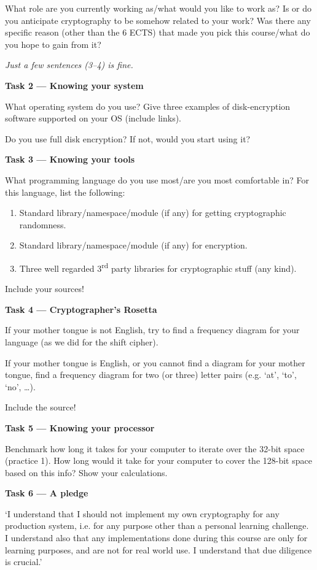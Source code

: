 \documentclass{practice}
\begin{document}
What role are you currently working as/what would you like to work as?
Is or do you anticipate cryptography to be somehow related to your work?
Was there any specific reason (other than the 6 ECTS) that made you pick this course/what do you hope to gain from it?

\textit{Just a few sentences (3--4) is fine.}

\textbf{Task 2 --- Knowing your system}

What operating system do you use? Give three examples of disk-encryption software supported on your OS (include links).

Do you use full disk encryption? If not, would you start using it?

\textbf{Task 3 --- Knowing your tools}

What programming language do you use most/are you most comfortable in?
For this language, list the following:
\begin{enumerate}
  \item Standard library/namespace/module (if any) for getting cryptographic randomness.
  \item Standard library/namespace/module (if any) for encryption.
  \item Three well regarded 3\textsuperscript{rd} party libraries for cryptographic stuff (any kind).
\end{enumerate}

Include your sources!

\textbf{Task 4 --- Cryptographer's Rosetta}

If your mother tongue is not English, try to find a frequency diagram for your language (as we did for the shift cipher).

If your mother tongue is English, or you cannot find a diagram for your mother tongue, find a frequency diagram for two (or three) letter pairs (e.g. `at', `to', `no', \dots).

Include the source!

\textbf{Task 5 --- Knowing your processor}

Benchmark how long it takes for your computer to iterate over the 32-bit space (practice 1). How long would it take for your computer to cover the 128-bit space based on this info? Show your calculations.

\textbf{Task 6 --- A pledge}

`I understand that I should not implement my own cryptography for any production system, i.e. for any purpose other than a personal learning challenge.
I understand also that any implementations done during this course are only for learning purposes, and are not for real world use. I understand that due diligence is crucial.'
\end{document}
